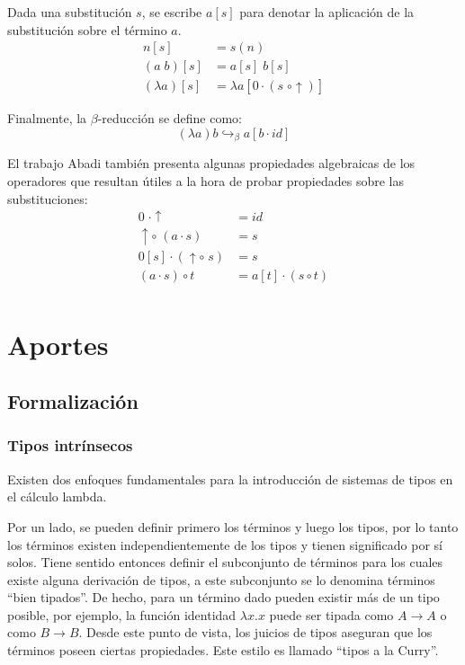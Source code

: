 \documentclass[]{report}
\begin{document}
	Dada una substitución $s$, se escribe $a[s]$ para denotar la aplicación de la substitución sobre el término $a$.
	\begin{align*}
		n[s] &= s(n) \\
		(a\; b)[s] &= a[s]\; b[s] \\
		(\lambda a)[s] &= \lambda a[0 \cdot (s \; \circ \uparrow)]
	\end{align*}
	
	Finalmente, la $\beta$-reducción se define como:
	\[ (\lambda a)b \hookrightarrow_{\beta} a[b \cdot id] \]
	
	El trabajo Abadi también presenta algunas propiedades algebraicas de los operadores que resultan útiles a la hora de probar propiedades sobre las substituciones:
	\begin{align*}
		0 \; \cdot \uparrow &= id \\
		\uparrow \circ\; (a \cdot s) &= s \\
		0[s] \cdot (\uparrow \circ\; s) &= s \\
		(a \cdot s) \circ t &= a[t] \cdot (s \circ t) \\
	\end{align*}
	
	
	\chapter{Aportes}
	\section{Formalización}
	
	\subsection{Tipos intrínsecos}
	
	Existen dos enfoques fundamentales para la introducción de sistemas de tipos en el cálculo lambda.

	Por un lado, se pueden definir primero los términos y luego los tipos, por lo tanto los términos existen independientemente de los tipos y tienen significado por sí solos.
	Tiene sentido entonces definir el subconjunto de términos para los cuales existe alguna derivación de tipos, a este subconjunto se lo denomina términos ``bien tipados''.
	De hecho, para un término dado pueden existir más de un tipo posible, por ejemplo, la función identidad $\lambda x.x$ puede ser tipada como $A \rightarrow A$ o como $B \rightarrow B$.
	Desde este punto de vista, los juicios de tipos aseguran que los términos poseen ciertas propiedades.
	Este estilo es llamado ``tipos a la Curry''.
	
\end{document}
